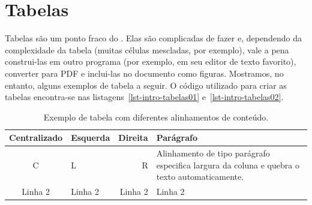 \section{Tabelas}
\label{sec-fundteo-tabelas}

Tabelas são um ponto fraco do \latex. Elas são complicadas de fazer e, dependendo da complexidade da tabela (muitas células mescladas, por exemplo), vale a pena construi-las em outro programa (por exemplo, em seu editor de texto favorito), converter para PDF e inclui-las no documento como figuras. Mostramos, no entanto, alguns exemplos de tabela a seguir. O código utilizado para criar as tabelas encontra-se nas listagens~\ref{lst-intro-tabelas01} e~\ref{lst-intro-tabelas02}. 





\begin{table}
\caption{Exemplo de tabela com diferentes alinhamentos de conteúdo.}
\label{tbl-intro-exemplo01}
\centering
\begin{tabular}{ | c | l | r | p{40mm} |}\hline
\textbf{Centralizado} & \textbf{Esquerda} & \textbf{Direita} & \textbf{Parágrafo}\\\hline
C & L & R & Alinhamento de tipo parágrafo especifica largura da coluna e quebra o texto automaticamente.\\
\hline
Linha 2 & Linha 2 & Linha 2 & Linha 2\\
\hline
\end{tabular}
\end{table}

